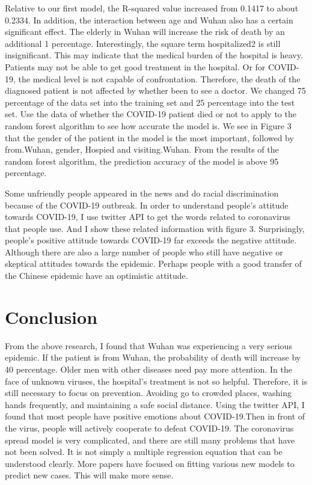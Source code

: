\documentclass[12pt,english]{article}
\begin{document}
Relative to our first model, the R-squared value increased from 0.1417 to about 0.2334. In addition, the interaction between age and Wuhan also has a certain significant effect. The elderly in Wuhan will increase the risk of death by an additional 1 percentage. 
Interestingly, the square  term hospitalized2 is still insignificant. This may indicate that the medical burden of the hospital is heavy. Patients may not be able to get good treatment in the hospital. Or for COVID-19, the medical level is not capable of confrontation. Therefore, the death of the diagnosed patient is not affected by whether been to see a doctor.
\newline
We changed 75 percentage of the data set into the training set and 25 percentage into the test set. Use the data of whether the COVID-19 patient died or not to apply to the random forest algorithm to see how accurate the model is. We see in Figure 3 that the gender of the patient in the model is the most important, followed by from.Wuhan, gender, Hospied and visiting.Wuhan. From the results of the random forest algorithm, the prediction accuracy of the model is above 95 percentage.

\newline

Some unfriendly people appeared in the news and do racial discrimination because of the COVID-19 outbreak. In order to understand people's attitude towards COVID-19, I use twitter API to get the words related to coronavirus that people use. And I show these related information with figure 3. Surprisingly, people's positive attitude towards COVID-19 far exceeds the negative attitude. Although there are also a large number of people who still have negative or skeptical attitudes towards the epidemic. Perhaps people with a good transfer of the Chinese epidemic have an optimistic attitude.





\section{Conclusion}
From the above research, I found that Wuhan was experiencing  a very serious epidemic. If the patient is from Wuhan, the probability of death will increase by 40 percentage. Older men with other diseases need pay more attention. In the face of unknown viruses, the hospital's treatment is not so helpful. Therefore, it is still necessary to focus on prevention. Avoiding go to crowded places, washing hands frequently, and maintaining a safe social distance.
Using the twitter API, I found that most people have positive emotions about COVID-19.Then in front of the virus, people will actively cooperate to defeat COVID-19.
\newline
The coronavirus spread model is very complicated, and there are still many problems that have not been solved. It is not simply a multiple regression equation that can be understood clearly. More papers have focused on fitting various new models to predict new cases. This will make more sense.
\end{document}
